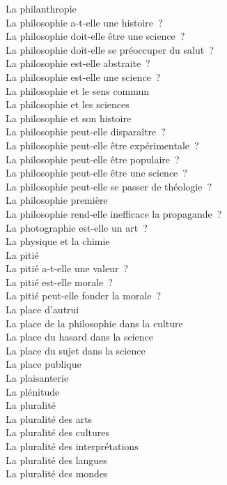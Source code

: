 \documentclass[a4paper,12pt]{article}
\begin{document}
La philanthropie \\
La philosophie a-t-elle une histoire ? \\
La philosophie doit-elle être une science ? \\
La philosophie doit-elle se préoccuper du salut ? \\
La philosophie est-elle abstraite ? \\
La philosophie est-elle une science ? \\
La philosophie et le sens commun \\
La philosophie et les sciences \\
La philosophie et son histoire \\
La philosophie peut-elle disparaître ? \\
La philosophie peut-elle être expérimentale ? \\
La philosophie peut-elle être populaire ? \\
La philosophie peut-elle être une science ? \\
La philosophie peut-elle se passer de théologie ? \\
La philosophie première \\
La philosophie rend-elle inefficace la propagande ? \\
La photographie est-elle un art ? \\
La physique et la chimie \\
La pitié \\
La pitié a-t-elle une valeur ? \\
La pitié est-elle morale ? \\
La pitié peut-elle fonder la morale ? \\
La place d'autrui \\
La place de la philosophie dans la culture \\
La place du hasard dans la science \\
La place du sujet dans la science \\
La place publique \\
La plaisanterie \\
La plénitude \\
La pluralité \\
La pluralité des arts \\
La pluralité des cultures \\
La pluralité des interprétations \\
La pluralité des langues \\
La pluralité des mondes \\
\end{document}
